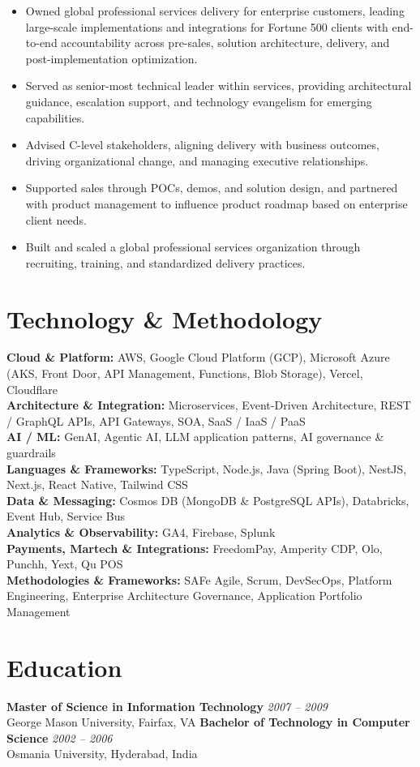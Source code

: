 \documentclass[11pt]{article}
\begin{document}
\begin{itemize}
  \item Owned global professional services delivery for enterprise customers, leading large-scale implementations and integrations for Fortune 500 clients with end-to-end accountability across pre-sales, solution architecture, delivery, and post-implementation optimization.
  \item Served as senior-most technical leader within services, providing architectural guidance, escalation support, and technology evangelism for emerging capabilities.
  \item Advised C-level stakeholders, aligning delivery with business outcomes, driving organizational change, and managing executive relationships.
  \item Supported sales through POCs, demos, and solution design, and partnered with product management to influence product roadmap based on enterprise client needs.
  \item Built and scaled a global professional services organization through recruiting, training, and standardized delivery practices.
\end{itemize}

\section*{Technology \& Methodology}
\textbf{Cloud \& Platform:} AWS, Google Cloud Platform (GCP), Microsoft Azure (AKS, Front Door, API Management, Functions, Blob Storage), Vercel, Cloudflare \\
\textbf{Architecture \& Integration:} Microservices, Event-Driven Architecture, REST / GraphQL APIs, API Gateways, SOA, SaaS / IaaS / PaaS \\
\textbf{AI / ML:} GenAI, Agentic AI, LLM application patterns, AI governance \& guardrails \\
\textbf{Languages \& Frameworks:} TypeScript, Node.js, Java (Spring Boot), NestJS, Next.js, React Native, Tailwind CSS \\
\textbf{Data \& Messaging:} Cosmos DB (MongoDB \& PostgreSQL APIs), Databricks, Event Hub, Service Bus \\
\textbf{Analytics \& Observability:} GA4, Firebase, Splunk \\
\textbf{Payments, Martech \& Integrations:} FreedomPay, Amperity CDP, Olo, Punchh, Yext, Qu POS \\
\textbf{Methodologies \& Frameworks:} SAFe Agile, Scrum, DevSecOps, Platform Engineering, Enterprise Architecture Governance, Application Portfolio Management

\section*{Education}
\textbf{Master of Science in Information Technology} \hfill \textit{2007 -- 2009} \\
George Mason University, Fairfax, VA
\newline
\textbf{Bachelor of Technology in Computer Science} \hfill \textit{2002 -- 2006} \\
Osmania University, Hyderabad, India
\end{document}
